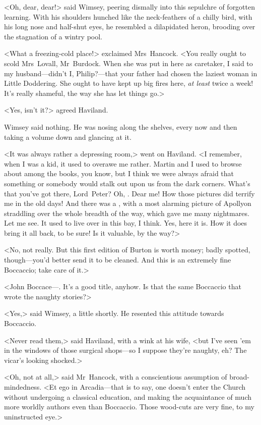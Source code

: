 <Oh, dear, dear!> said Wimsey, peering dismally into this sepulchre of forgotten learning. With his shoulders hunched like the neck-feathers of a chilly bird, with his long nose and half-shut eyes, he resembled a dilapidated heron, brooding over the stagnation of a wintry pool.

<What a freezing-cold place!> exclaimed Mrs~Hancock. <You really ought to scold Mrs~Lovall, Mr~Burdock. When she was put in here as caretaker, I said to my husband—didn't I, Philip?—that your father had chosen the laziest woman in Little Doddering. She ought to have kept up big fires here, \emph{at least} twice a week! It's really shameful, the way she has let things go.>

<Yes, isn't it?> agreed Haviland.

Wimsey said nothing. He was nosing along the shelves, every now and then taking a volume down and glancing at it.

<It was always rather a depressing room,> went on Haviland. <I remember, when I was a kid, it used to overawe me rather. Martin and I used to browse about among the books, you know, but I think we were always afraid that something or somebody would stalk out upon us from the dark corners. What's that you've got there, Lord~Peter? Oh, . Dear me! How those pictures did terrify me in the old days! And there was a , with a most alarming picture of Apollyon straddling over the whole breadth of the way, which gave me many nightmares. Let me see. It used to live over in this bay, I think. Yes, here it is. How it does bring it all back, to be sure! Is it valuable, by the way?>

<No, not really. But this first edition of Burton is worth money; badly spotted, though—you'd better send it to be cleaned. And this is an extremely fine Boccaccio; take care of it.>

<John Boccace—. It's a good title, anyhow. Is that the same Boccaccio that wrote the naughty stories?>

<Yes,> said Wimsey, a little shortly. He resented this attitude towards Boccaccio.

<Never read them,> said Haviland, with a wink at his wife, <but I've seen 'em in the windows of those surgical shops—so I suppose they're naughty, eh? The vicar's looking shocked.>

<Oh, not at all,> said Mr~Hancock, with a conscientious assumption of broad-mindedness. <Et ego in Arcadia—that is to say, one doesn't enter the Church without undergoing a classical education, and making the acquaintance of much more worldly authors even than Boccaccio. Those wood-cuts are very fine, to my uninstructed eye.>

